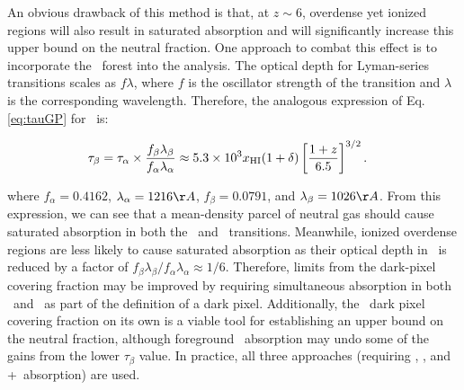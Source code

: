 An obvious drawback of this method is that, at $z \sim 6$, overdense yet ionized regions will also result in saturated absorption and will significantly increase this upper bound on the neutral fraction. One approach to combat this effect is to incorporate the \lyb\ forest into the analysis. The optical depth for Lyman-series transitions scales as $f\lambda$, where $f$ is the oscillator strength of the transition and $\lambda$ is the corresponding wavelength. Therefore, the analogous expression of Eq. \ref{eq:tauGP} for \lyb\ is:

\begin{align}
\tau_{\beta} &= \tau_{\alpha} \times \dfrac{f_{\beta}\lambda_{\beta}}{f_{\alpha}\lambda_{\alpha}} \approx 5.3 \times 10^{3} x_{\text{HI}} (1 + \delta) \left[\dfrac{1+z}{6.5}\right]^{3/2}. \label{eq:tauGPB}
\end{align}

where $f_{\alpha} = 0.4162$, $\lambda_{\alpha} = 1216 \AA$, $f_{\beta} = 0.0791$, and $\lambda_{\beta} = 1026\AA$. From this expression, we can see that a mean-density parcel of neutral gas should cause saturated absorption in both the \lya\ and \lyb\ transitions. Meanwhile, ionized overdense regions are less likely to cause saturated absorption as their optical depth in \lyb\ is reduced by a factor of $f_{\beta}\lambda_{\beta}/f_{\alpha}\lambda_{\alpha} \approx 1/6$. Therefore, limits from the dark-pixel covering fraction may be improved by requiring simultaneous absorption in both \lya\ and \lyb\ as part of the definition of a dark pixel. Additionally, the \lyb\ dark pixel covering fraction on its own is a viable tool for establishing an upper bound on the neutral fraction, although foreground \lya\ absorption may undo some of the gains from the lower $\tau_{\beta}$ value. In practice, all three approaches (requiring \lya, \lyb, and \lya +\lyb\ absorption) are used. 

